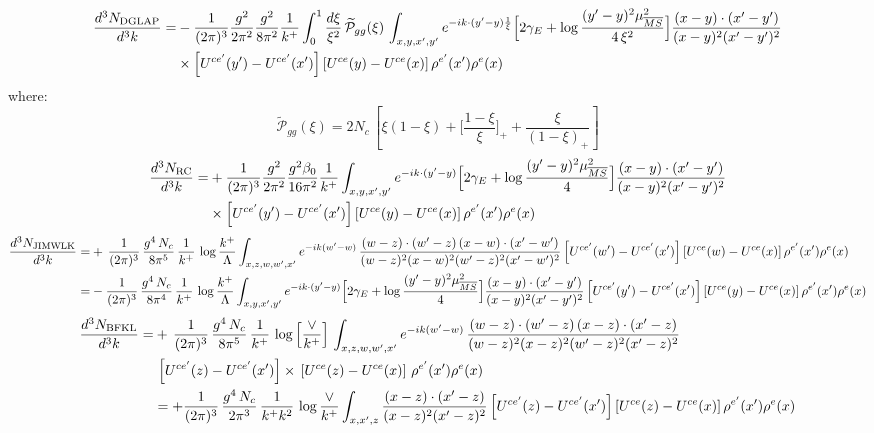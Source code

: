 \documentclass[9pt]{article}
\numberwithin{equation}{section}
\begin{document}
\begin{align}
\frac{d^{3}N_{\rm DGLAP}}{d^{3}k}= &-\frac{1}{(2\pi)^{3}}\frac{g^{2}}{2\pi^{2}}\frac{g^{2}}{8\pi^{2}}\frac{1}{k^{+}}\int_{0}^{1}\frac{d\xi}{\xi^{2}}\,\widetilde{\mathcal P}_{gg}(\xi)\,\int_{x,y,x',y'}e^{-ik\cdot(y'-y)\frac{1}{\xi}}\Big[2\gamma_{E}+\log\frac{(y'-y)^{2}\mu^{2}_{\overline{MS}}}{4\,\xi^{2}}\Big]\frac{(x-y)\cdot(x'-y')}{(x-y)^{2}(x'-y')^{2}}\notag\\
&\times\left[U^{ce'}(y') - U^{ce'}(x')\right]\left[U^{ce}(y) - U^{ce}(x)\right]\rho^{e'}(x')\rho^{e}(x)
\end{align}
where: $$\widetilde{\mathcal P}_{gg}(\xi) = 2N_{c}\,\left[\xi(1-\xi)+\Big[\frac{1-\xi}{\xi}\Big]_{+}+\frac{\xi}{(1-\xi)_{+}}\right] $$
\begin{align}
\frac{d^{3}N_{\rm RC}}{d^{3}k}= & +\frac{1}{(2\pi)^{3}}\frac{g^{2}}{2\pi^{2}}\frac{g^{2}\beta_{0}}{16\pi^{2}}\frac{1}{k^{+}}\int_{x,y,x',y'}e^{-ik\cdot(y'-y)}\Big[2\gamma_{E}+\log\frac{(y'-y)^{2}\mu^{2}_{\overline{MS}}}{4}\Big]\frac{(x-y)\cdot(x'-y')}{(x-y)^{2}(x'-y')^{2}}\notag\\
&\times\left[U^{ce'}(y') - U^{ce'}(x')\right]\left[U^{ce}(y) - U^{ce}(x)\right]\rho^{e'}(x')\rho^{e}(x)
\end{align}
\begin{align}
\frac{d^{3}N_{\rm JIMWLK}}{d^{3}k}= & +\,\frac{1}{(2\pi)^{3}}\,\frac{g^{4}\,N_{c}}{8\pi^{5}}\,\frac{1}{k^{+}}\,\log\frac{k^{+}}{\Lambda}\int_{x,z,w,w',x'}e^{-ik(w'-w)}\,\frac{(w-z)\cdot (w'-z)\,(x-w)\cdot (x'-w')}{(w-z)^{2}(x-w)^{2}(w'-z)^{2}(x'-w')^{2}}\left[U^{ce'}(w') - U^{ce'}(x')\right]\left[U^{ce}(w) - U^{ce}(x)\right]\rho^{e'}(x') \rho^{e}(x)\notag \\
= & -\frac{1}{(2\pi)^{3}}\,\frac{g^{4}\,N_{c}}{8\pi^{4}}\,\frac{1}{k^{+}}\,\log\frac{k^{+}}{\Lambda}\int_{x,y,x',y'}e^{-ik\cdot(y'-y)}\Big[2\gamma_{E}+\log\frac{(y'-y)^{2}\mu^{2}_{\overline{MS}}}{4}\Big]\frac{(x-y)\cdot(x'-y')}{(x-y)^{2}(x'-y')^{2}}\left[U^{ce'}(y') - U^{ce'}(x')\right]\left[U^{ce}(y) - U^{ce}(x)\right]\rho^{e'}(x')\rho^{e}(x)
\end{align}
\begin{align}
\frac{d^{3}N_{\rm BFKL}}{d^{3}k}= &    +\,\frac{1}{(2\pi)^{3}}\,\frac{g^{4}\,N_{c}}{8\pi^{5}}\,\frac{1}{k^{+}}\,\log{\left[\frac{\vee}{k^{+}}\right]}\,\int_{x,z,w,w',x'}e^{-ik(w'-w)}\,\frac{(w-z)\cdot (w'-z)\,(x-z)\cdot (x'-z)}{(w-z)^{2}(x-z)^{2}(w'-z)^{2}(x'-z)^{2}}\notag\\ & \, \left[U^{ce'}(z) - U^{ce'}(x')\right] \times\, \left[U^{ce}(z) - U^{ce}(x)\right]\, \rho^{e'}(x') \rho^{e}(x)\notag \\ & = +\frac{1}{(2\pi)^{3}}\,\frac{g^{4}\,N_{c}}{2\pi^{3}}\,\frac{1}{k^{+}k^{2}}\,\log\frac{\vee}{k^{+}}\int_{x,x',z}\frac{(x-z)\cdot(x'-z)}{(x-z)^{2}(x'-z)^{2}}\left[U^{ce'}(z) - U^{ce'}(x')\right]\left[U^{ce}(z) - U^{ce}(x)\right]\rho^{e'}(x')\rho^{e}(x)
\end{align}
\end{document}
